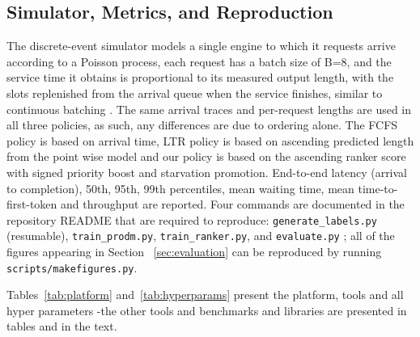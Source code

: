 \documentclass[conference]{IEEEtran}
\begin{document}
\subsection{Simulator, Metrics, and Reproduction}\label{sec:simulator}
The discrete-event simulator models a single engine to which it requests arrive according to a Poisson process, each request has a batch size of B=8, and the service time it obtains is proportional to its measured output length, with the slots replenished from the arrival queue when the service finishes, similar to continuous batching \cite{yu2022orca}. The same arrival traces and per-request lengths are used in all three policies, as such, any differences are due to ordering alone. The FCFS policy is based on arrival time, LTR policy is based on ascending predicted length from the point wise model and our policy is based on the ascending ranker score with signed priority boost and starvation promotion. End-to-end latency (arrival to completion), 50th, 95th, 99th percentiles, mean waiting time, mean time-to-first-token and throughput are reported.
Four commands are documented in the repository README that are required to reproduce: \texttt{generate\_labels.py} (resumable), \texttt{train\_prodm.py}, 
\texttt{train\_ranker.py}, and \texttt{evaluate.py} ; all of the figures appearing in Section ~\ref{sec:evaluation} can be reproduced by running \texttt{scripts/makefigures.py}.

Tables~\ref{tab:platform} and~\ref{tab:hyperparams} present the platform, tools and all hyper parameters -the other tools and benchmarks and libraries are presented in tables and in the text.
\end{document}
